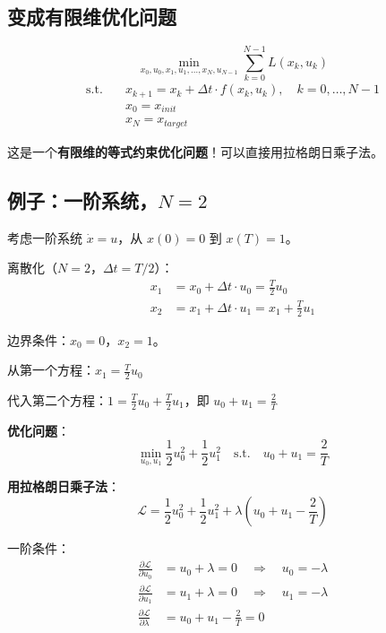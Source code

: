 \subsection{变成有限维优化问题}

\begin{keyformula}[title=离散轨迹优化]
\begin{equation}
\min_{x_0, u_0, x_1, u_1, \ldots, x_N, u_{N-1}} \sum_{k=0}^{N-1} L(x_k, u_k)
\end{equation}
\begin{align}
\text{s.t.} \quad & x_{k+1} = x_k + \Delta t \cdot f(x_k, u_k), \quad k = 0, \ldots, N-1 \\
& x_0 = x_{init} \\
& x_N = x_{target}
\end{align}
\end{keyformula}

这是一个\textbf{有限维的等式约束优化问题}！可以直接用拉格朗日乘子法。

\subsection{例子：一阶系统，$N = 2$}

考虑一阶系统 $\dot{x} = u$，从 $x(0) = 0$ 到 $x(T) = 1$。

离散化（$N=2$，$\Delta t = T/2$）：
\begin{align}
x_1 &= x_0 + \Delta t \cdot u_0 = \frac{T}{2} u_0 \\
x_2 &= x_1 + \Delta t \cdot u_1 = x_1 + \frac{T}{2} u_1
\end{align}

边界条件：$x_0 = 0$，$x_2 = 1$。

从第一个方程：$x_1 = \frac{T}{2} u_0$

代入第二个方程：$1 = \frac{T}{2} u_0 + \frac{T}{2} u_1$，即 $u_0 + u_1 = \frac{2}{T}$

\textbf{优化问题}：
\[
\min_{u_0, u_1} \frac{1}{2}u_0^2 + \frac{1}{2}u_1^2 \quad \text{s.t.} \quad u_0 + u_1 = \frac{2}{T}
\]

\textbf{用拉格朗日乘子法}：
\[
\mathcal{L} = \frac{1}{2}u_0^2 + \frac{1}{2}u_1^2 + \lambda\left(u_0 + u_1 - \frac{2}{T}\right)
\]

一阶条件：
\begin{align}
\frac{\partial \mathcal{L}}{\partial u_0} &= u_0 + \lambda = 0 \quad \Rightarrow \quad u_0 = -\lambda \\
\frac{\partial \mathcal{L}}{\partial u_1} &= u_1 + \lambda = 0 \quad \Rightarrow \quad u_1 = -\lambda \\
\frac{\partial \mathcal{L}}{\partial \lambda} &= u_0 + u_1 - \frac{2}{T} = 0
\end{align}

